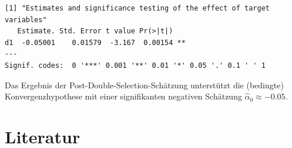 \documentclass[
  a4paper,
  DIV=11,
  oneside]{scrreprt}
\begin{document}
\begin{verbatim}
[1] "Estimates and significance testing of the effect of target variables"
   Estimate. Std. Error t value Pr(>|t|)   
d1  -0.05001    0.01579  -3.167  0.00154 **
---
Signif. codes:  0 '***' 0.001 '**' 0.01 '*' 0.05 '.' 0.1 ' ' 1
\end{verbatim}

Das Ergebnis der Post-Double-Selection-Schätzung unterstützt die
(bedingte) Konvergenzhypothese mit einer signifikanten negativen
Schätzung \(\widehat{\alpha}_0\approx-0.05\).


\hypertarget{literatur-1}{%
\chapter*{Literatur}\label{literatur-1}}

\end{document}
